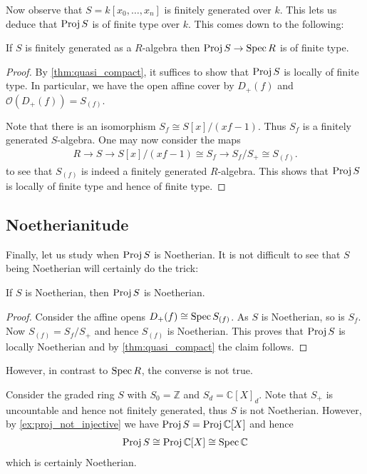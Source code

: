 \documentclass{article}
\begin{document}
Now observe that $S=k[x_0,\ldots,x_n]$ is finitely generated over
$k$. This lets us deduce that $\operatorname{Proj} S$ is of finite type over $k$.
This comes down to the following:

\begin{lemma}\label{thm:finite_type}
  If $S$ is finitely generated as a $R$-algebra then
  $\operatorname{Proj} S\to\operatorname{Spec} R$ is of finite type.
  \begin{proof}
    By \ref{thm:quasi_compact}, it suffices to show that $\operatorname{Proj} S$
    is locally of finite type. In particular, we have the open affine
    cover by $D_+(f)$ and $\mathcal O(D_+(f)) = S_{(f)}$.

    Note that there is an isomorphism $S_f \cong S[x]/(xf - 1)$.
    Thus $S_f$ is a finitely generated $S$-algebra. One may
    now consider the maps
    \begin{align*}
      R\longrightarrow S
      \longrightarrow S[x]/(xf-1) \cong S_f
      \longrightarrow S_f/S_+ \cong S_{(f)}.
    \end{align*}
    to see that $S_{(f)}$ is indeed a finitely generated $R$-algebra.
    This shows that $\operatorname{Proj} S$ is locally of finite type and hence
    of finite type.
  \end{proof}
\end{lemma}


\subsection{Noetherianitude}

Finally, let us study when $\operatorname{Proj} S$ is Noetherian. It is not
difficult to see that $S$ being Noetherian will certainly do
the trick:

\begin{proposition}
  If $S$ is Noetherian, then $\operatorname{Proj} S$ is Noetherian.
  \begin{proof}
    Consider the affine opens $D_+(f)\cong\operatorname{Spec} S_{(f)}$.
    As $S$ is Noetherian, so is $S_f$. Now
    $S_{(f)} = S_f / S_+$ and hence $S_{(f)}$ is Noetherian.
    This proves that $\operatorname{Proj} S$ is locally Noetherian and
    by \ref{thm:quasi_compact} the claim follows.
  \end{proof}
\end{proposition}

However, in contrast to $\operatorname{Spec} R$, the converse is not true.

\begin{example}
  Consider the graded ring $S$ with $S_0 = \mathbb{Z}$
  and $S_d = \mathbb{C}[X]_d$. Note that $S_+$ is uncountable and
  hence not finitely generated, thus $S$ is not Noetherian.
  However, by \ref{ex:proj_not_injective} we have
  $\operatorname{Proj} S = \operatorname{Proj} \mathbb{C}[X]$ and hence
  \begin{align*}
    \operatorname{Proj} S \cong \operatorname{Proj} \mathbb{C}[X] \cong \operatorname{Spec} \mathbb{C}
  \end{align*}
  which is certainly Noetherian.
\end{example}
\end{document}
